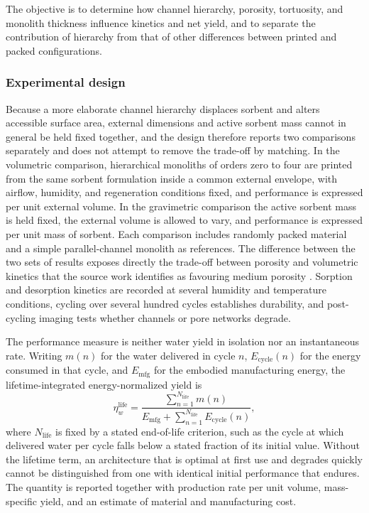 \documentclass[11pt]{article}
\theoremstyle{definition}
\begin{document}
The objective is to determine how channel hierarchy, porosity, tortuosity, and monolith thickness influence kinetics and net yield, and to separate the contribution of hierarchy from that of other differences between printed and packed configurations.

\subsubsection*{Experimental design}

Because a more elaborate channel hierarchy displaces sorbent and alters accessible surface area, external dimensions and active sorbent mass cannot in general be held fixed together, and the design therefore reports two comparisons separately and does not attempt to remove the trade-off by matching. In the volumetric comparison, hierarchical monoliths of orders zero to four are printed from the same sorbent formulation inside a common external envelope, with airflow, humidity, and regeneration conditions fixed, and performance is expressed per unit external volume. In the gravimetric comparison the active sorbent mass is held fixed, the external volume is allowed to vary, and performance is expressed per unit mass of sorbent. Each comparison includes randomly packed material and a simple parallel-channel monolith as references. The difference between the two sets of results exposes directly the trade-off between porosity and volumetric kinetics that the source work identifies as favouring medium porosity \cite{bai2026}. Sorption and desorption kinetics are recorded at several humidity and temperature conditions, cycling over several hundred cycles establishes durability, and post-cycling imaging tests whether channels or pore networks degrade.

The performance measure is neither water yield in isolation nor an instantaneous rate. Writing $m(n)$ for the water delivered in cycle $n$, $E_{\mathrm{cycle}}(n)$ for the energy consumed in that cycle, and $E_{\mathrm{mfg}}$ for the embodied manufacturing energy, the lifetime-integrated energy-normalized yield is
\begin{equation}
\eta_w^{\mathrm{life}}=\frac{\sum_{n=1}^{N_{\mathrm{life}}}m(n)}{E_{\mathrm{mfg}}+\sum_{n=1}^{N_{\mathrm{life}}}E_{\mathrm{cycle}}(n)},
\end{equation}
where $N_{\mathrm{life}}$ is fixed by a stated end-of-life criterion, such as the cycle at which delivered water per cycle falls below a stated fraction of its initial value. Without the lifetime term, an architecture that is optimal at first use and degrades quickly cannot be distinguished from one with identical initial performance that endures. The quantity is reported together with production rate per unit volume, mass-specific yield, and an estimate of material and manufacturing cost.
\end{document}

